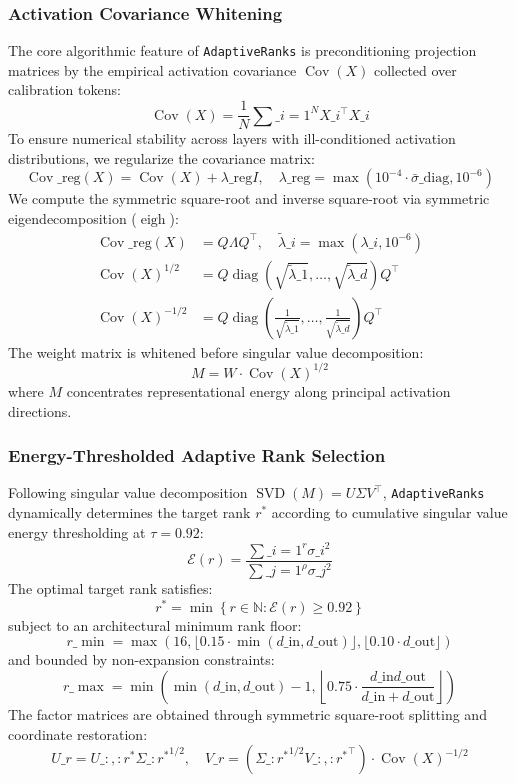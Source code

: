 \subsubsection{Activation Covariance Whitening}
\label{sec:covariance_whitening}
The core algorithmic feature of \texttt{AdaptiveRanks} is preconditioning projection matrices by the empirical activation covariance $\operatorname{Cov}(X)$ collected over calibration tokens:
\[
\operatorname{Cov}(X) = \frac{1}{N} \sum\_{i=1}^N X\_i^\top X\_i
\]
To ensure numerical stability across layers with ill-conditioned activation distributions, we regularize the covariance matrix:
\[
\operatorname{Cov}\_{\text{reg}}(X) = \operatorname{Cov}(X) + \lambda\_{\text{reg}} I, \quad \lambda\_{\text{reg}} = \max(10^{-4} \cdot \bar{\sigma}\_{\text{diag}}, 10^{-6})
\]
We compute the symmetric square-root and inverse square-root via symmetric eigendecomposition ($\operatorname{eigh}$):
\begin{align}
\operatorname{Cov}\_{\text{reg}}(X) &= Q \Lambda Q^\top, \quad \tilde{\lambda}\_i = \max(\lambda\_i, 10^{-6}) \\
\operatorname{Cov}(X)^{1/2} &= Q \operatorname{diag}\left(\sqrt{\tilde{\lambda}\_1}, \dots, \sqrt{\tilde{\lambda}\_d}\right) Q^\top \\
\operatorname{Cov}(X)^{-1/2} &= Q \operatorname{diag}\left(\frac{1}{\sqrt{\tilde{\lambda}\_1}}, \dots, \frac{1}{\sqrt{\tilde{\lambda}\_d}}\right) Q^\top
\end{align}
The weight matrix is whitened before singular value decomposition:
\[
M = W \cdot \operatorname{Cov}(X)^{1/2}
\]
where $M$ concentrates representational energy along principal activation directions.

\subsubsection{Energy-Thresholded Adaptive Rank Selection}
\label{sec:adaptive_rank_selection}
Following singular value decomposition $\operatorname{SVD}(M) = U \Sigma V^\top$, \texttt{AdaptiveRanks} dynamically determines the target rank $r^*$ according to cumulative singular value energy thresholding at $\tau = 0.92$:
\[
\mathcal{E}(r) = \frac{\sum\_{i=1}^r \sigma\_i^2}{\sum\_{j=1}^\rho \sigma\_j^2}
\]
The optimal target rank satisfies:
\[
r^* = \min \left\{ r \in \mathbb{N} : \mathcal{E}(r) \ge 0.92 \right\}
\]
subject to an architectural minimum rank floor:
\[
r\_{\min} = \max\left(16, \lfloor 0.15 \cdot \min(d\_{\text{in}}, d\_{\text{out}})\rfloor, \lfloor 0.10 \cdot d\_{\text{out}}\rfloor\right)
\]
and bounded by non-expansion constraints:
\[
r\_{\max} = \min\left(\min(d\_{\text{in}}, d\_{\text{out}}) - 1, \left\lfloor 0.75 \cdot \frac{d\_{\text{in}} d\_{\text{out}}}{d\_{\text{in}} + d\_{\text{out}}}\right\rfloor\right)
\]
The factor matrices are obtained through symmetric square-root splitting and coordinate restoration:
\[
U\_r = U\_{:, :r^*} \Sigma\_{:r^*}^{1/2}, \quad V\_r = \left(\Sigma\_{:r^*}^{1/2} V\_{:, :r^*}^\top\right) \cdot \operatorname{Cov}(X)^{-1/2}
\]

